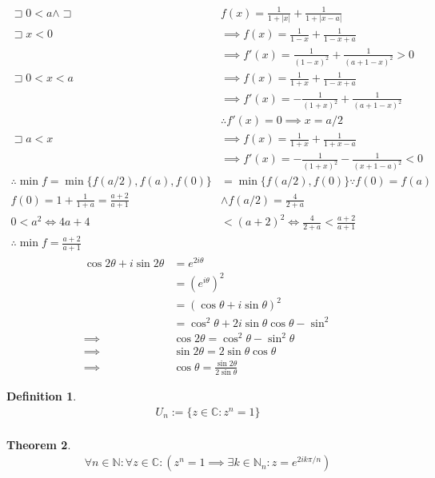 \documentclass[a4paper,11pt]{article}
\theoremstyle{plain}
\newtheorem{theorem}{Theorem}
\theoremstyle{definition}
\newtheorem{definition}[theorem]{Definition}
\newcommand{\N}{\mathbb{N}}
\newcommand{\C}{\mathbb{C}}
\newcommand{\iff}{\Longleftrightarrow}
\newcommand{\lett}{\sqsupset}
\begin{document}
\begin{align*}
	\lett 0<a \land \lett &f(x)=\frac{1}{1+|x|}+\frac{1}{1+|x-a|}\\
	\lett x< 0 &\implies f(x)=\frac{1}{1-x}+\frac{1}{1-x+a}\\&\implies
	f'(x)=\frac{1}{{(1-x)}^2}+\frac{1}{{(a+1-x)}^2}>0\\
	\lett 0<x< a &\implies f(x)=\frac{1}{1+x}+\frac{1}{1-x+a}\\&\implies
	f'(x)=-\frac{1}{{(1+x)}^2}+\frac{1}{{(a+1-x)}^2}\\
	&\therefore f'(x)=0\implies x=a/2\\
	\lett a< x &\implies f(x)=\frac{1}{1+x}+\frac{1}{1+x-a}\\&\implies
	f'(x)=-\frac{1}{{(1+x)}^2}-\frac{1}{{(x+1-a)}^2}<0\\
	\therefore \min f=\min \{f(a/2),f(a),f(0)\}&=\min\{f(a/2),f(0)\}\because
	f(0)=f(a)\\
	f(0)=1+\frac{1}{1+a}=\frac{a+2}{a+1}&\land f(a/2)=\frac{4}{2+a}\\
	0<a^2\iff 4a+4&<{(a+2)}^2\iff \frac{4}{2+a}<\frac{a+2}{a+1}\\
	\therefore \min f =\frac{a+2}{a+1}
\end{align*}
\newpage
\begin{align*}
	\cos 2\theta + i \sin 2\theta &= e^{2i\theta } \\
								  &= {\left(e^{i\theta }\right)}^2 \\
								  &= {\left(\cos \theta+i\sin \theta\right)}^2\\
								  &= \cos^2 \theta 
									 + 2i \sin \theta \cos \theta - \sin^2 \\
	\implies &\cos 2\theta = \cos^2 \theta - \sin^2 \theta \\
	\implies &\sin 2\theta = 2 \sin \theta \cos \theta \\
	\implies &\cos \theta = \frac{\sin 2\theta}{2\sin \theta}
\end{align*}
\begin{definition}
\begin{align*}
	U_n := \{z\in \C: z^n = 1\} \\
\end{align*}
\end{definition}
\begin{theorem}
\begin{align*}
	\forall n \in \N: \forall z\in \C:  
	(z^n = 1 \implies \exists k \in \N_n : z = e^{2i k\pi / n})
\end{align*}
\end{theorem}
\end{document}
